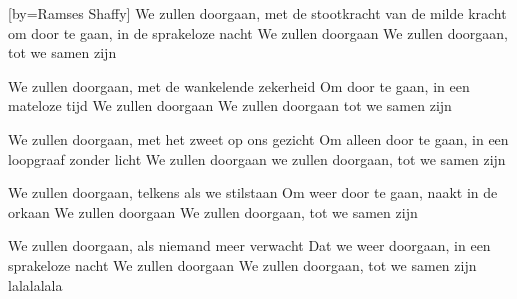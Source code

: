 [by={Ramses Shaffy}]
\beginverse
We zullen doorgaan, met de stootkracht van de milde kracht
om door te gaan, in de sprakeloze nacht
We zullen doorgaan
We zullen doorgaan, tot we samen zijn
\endverse

\beginverse
We zullen doorgaan, met de wankelende zekerheid
Om door te gaan, in een mateloze tijd
We zullen doorgaan
We zullen doorgaan tot we samen zijn
\endverse

\beginverse
We zullen doorgaan, met het zweet op ons gezicht
Om alleen door te gaan, in een loopgraaf zonder licht
We zullen doorgaan we zullen doorgaan, tot we samen zijn
\endverse

\beginverse
We zullen doorgaan, telkens als we stilstaan
Om weer door te gaan, naakt in de orkaan
We zullen doorgaan
We zullen doorgaan, tot we samen zijn
\endverse

\beginverse
We zullen doorgaan, als niemand meer verwacht
Dat we weer doorgaan, in een sprakeloze nacht
We zullen doorgaan
We zullen doorgaan, tot we samen zijn
lalalalala
\endverse
\endsong